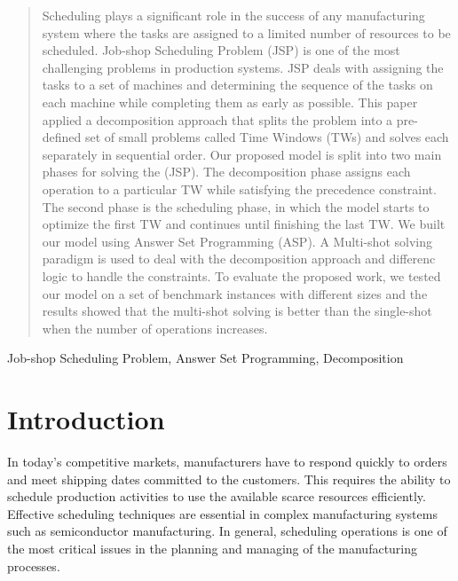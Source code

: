 \documentclass{tlp} %
\begin{document}
\maketitle              %
%
\begin{abstract}
    Scheduling plays a significant role in the success of any manufacturing system where the tasks are assigned to a limited number of resources to be scheduled. Job-shop Scheduling Problem (JSP) is one of the most challenging problems in production systems. JSP deals with assigning the tasks to a set of machines and determining the sequence of the tasks on each machine while completing them as early as possible. This paper applied a decomposition approach that splits the problem into a pre-defined set of small problems called Time Windows (TWs) and solves each separately in sequential order. Our proposed model is split into two main phases for solving the (JSP). The decomposition phase assigns each operation to a particular TW while satisfying the precedence constraint. The second phase is the scheduling phase, in which the model starts to optimize the first TW and continues until finishing the last TW. We built our model using Answer Set Programming (ASP). A Multi-shot solving paradigm is used to deal with the decomposition approach and differenc logic to handle the constraints. To evaluate the proposed work, we tested our model on a set of benchmark instances with different sizes and the results showed that the multi-shot solving is better than the single-shot when the number of operations increases. 
\end{abstract}
%
\begin{keywords}
Job-shop Scheduling Problem, Answer Set Programming, Decomposition
\end{keywords}
%
%
\section{Introduction}
In today's competitive markets, manufacturers have to respond quickly to orders and meet shipping dates committed to the customers. This requires the ability to schedule production activities to use the available scarce resources efficiently. Effective scheduling techniques are essential in complex manufacturing systems such as semiconductor manufacturing. In general, scheduling operations is one of the most critical issues in the planning and managing of the manufacturing processes\cite{uzsoy2000performance}. 
\end{document}
